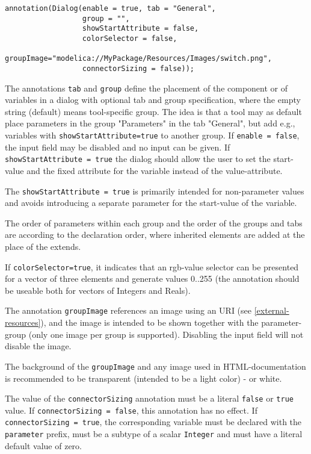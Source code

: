 \begin{lstlisting}[language=modelica]
annotation(Dialog(enable = true, tab = "General",
                  group = "",
                  showStartAttribute = false,
                  colorSelector = false,
                  groupImage="modelica://MyPackage/Resources/Images/switch.png",
                  connectorSizing = false));
\end{lstlisting}

The annotations \lstinline!tab! and \lstinline!group! define the placement of
the component or of variables in a dialog with optional tab and group
specification, where the empty string (default) means tool-specific group.
The idea is that a tool may as default place parameters in the group "Parameters" in the tab "General",
but add e.g., variables with \lstinline!showStartAttribute=true! to another group.
If \lstinline!enable = false!, the input field may
be disabled and no input can be given. If \lstinline!showStartAttribute = true! the dialog should allow the user to
set the start-value and the fixed attribute for the variable instead of the value-attribute.

\begin{nonnormative}
The \lstinline!showStartAttribute = true! is primarily intended for non-parameter values and avoids introducing
a separate parameter for the start-value of the variable.
\end{nonnormative}

The order of parameters within each group and the order of the groups and tabs are according
to the declaration order, where inherited elements are added at the place of the extends.

If \lstinline!colorSelector=true!, it indicates that an rgb-value selector can be
presented for a vector of three elements and generate values 0..255 (the
annotation should be useable both for vectors of Integers and Reals).

The annotation \lstinline!groupImage! references an image using an URI (see
\cref{external-resources}), and the image is intended to be shown together with the
parameter-group (only one image per group is supported). Disabling the
input field will not disable the image.

The background of the \lstinline!groupImage! and any image used in HTML-documentation is recommended to be transparent (intended to be a light color) - or white.

The value of the \lstinline!connectorSizing! annotation must be a literal
\lstinline!false! or \lstinline!true! value. If \lstinline!connectorSizing = false!, this annotation has no effect.
If \lstinline!connectorSizing = true!, the corresponding variable must be declared with the
\lstinline!parameter! prefix, must be a subtype of a scalar \lstinline!Integer! and
must have a literal default value of zero.

